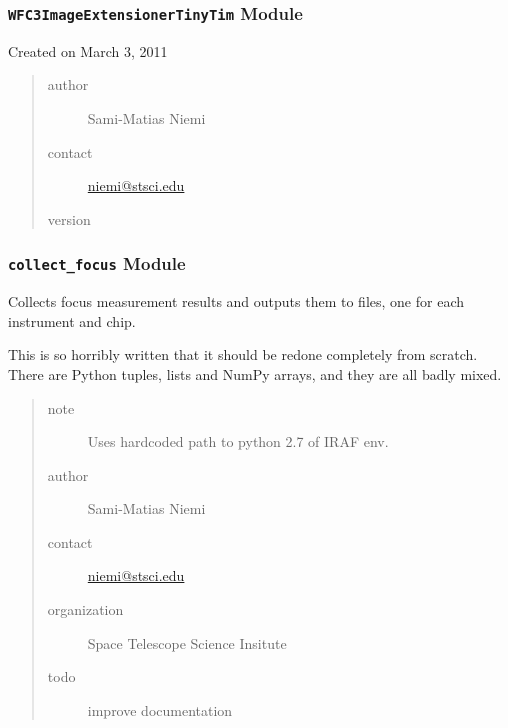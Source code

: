 \documentclass[letterpaper,10pt,english]{sphinxmanual}
\begin{document}
\subsubsection{\texttt{WFC3ImageExtensionerTinyTim} Module}
\label{SamPy.focus:wfc3imageextensionertinytim-module}\label{SamPy.focus:module-SamPy.focus.WFC3ImageExtensionerTinyTim}
Created on March 3, 2011
\begin{quote}\begin{description}
\item[{author}] \leavevmode
Sami-Matias Niemi

\item[{contact}] \leavevmode
\href{mailto:niemi@stsci.edu}{niemi@stsci.edu}

\item[{version}] 

\end{description}\end{quote}


\begin{fulllineitems}
\label{SamPy.focus:SamPy.focus.WFC3ImageExtensionerTinyTim.parse_parameterfile}
\end{fulllineitems}



\subsubsection{\texttt{collect\_focus} Module}
\label{SamPy.focus:module-SamPy.focus.collect_focus}\label{SamPy.focus:collect-focus-module}
Collects focus measurement results and outputs them
to files, one for each instrument and chip.

This is so horribly written that it should be redone 
completely from scratch. There are Python tuples, lists
and NumPy arrays, and they are all badly mixed.
\begin{quote}\begin{description}
\item[{note}] \leavevmode
Uses hardcoded path to python 2.7 of IRAF env.

\item[{author}] \leavevmode
Sami-Matias Niemi

\item[{contact}] \leavevmode
\href{mailto:niemi@stsci.edu}{niemi@stsci.edu}

\item[{organization}] \leavevmode
Space Telescope Science Insitute

\item[{todo}] \leavevmode
improve documentation

\end{description}\end{quote}
\end{document}
